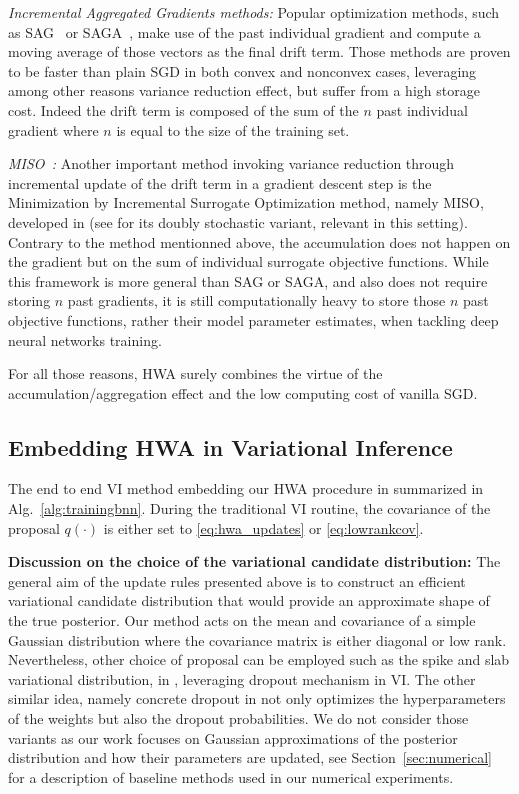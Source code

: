 \documentclass[tablecaption=bottom,wcp]{jmlr}
\begin{document}
\textit{Incremental Aggregated Gradients methods:} Popular optimization methods, such as SAG~\citep{schmidt2017minimizing} or SAGA~\citep{defazio2014saga}, make use of the past individual gradient and compute a moving average of those vectors as the final drift term. Those methods are proven to be faster than plain SGD in both convex and nonconvex cases, leveraging among other reasons variance reduction effect, but suffer from a high storage cost. Indeed the drift term is composed of the sum of the $n$ past individual gradient where $n$ is equal to the size of the training set.


\textit{MISO~\citep{mairal2015incremental}:} Another important method invoking variance reduction through incremental update of the drift term in a gradient descent step is the Minimization by Incremental Surrogate Optimization method, namely MISO, developed in \citet{mairal2015incremental} (see \citep{karimi2019doubly} for its doubly stochastic variant, relevant in this setting).
Contrary to the method mentionned above, the accumulation does not happen on the gradient but on the sum of individual surrogate objective functions.
While this framework is more general than SAG or SAGA, and also does not require storing $n$ past gradients, it is still computationally heavy to store those $n$ past objective functions, rather their model parameter estimates, when tackling deep neural networks training.

For all those reasons, \textsc{HWA} surely combines the virtue of the accumulation/aggregation effect and the low computing cost of vanilla SGD.



\subsection{Embedding HWA in Variational Inference}\label{app:viandhwa}
The end to end VI method embedding our HWA procedure in summarized in Alg.~\ref{alg:trainingbnn}.
During the traditional VI routine, the covariance of the proposal $q(\cdot)$ is either set to \eqref{eq:hwa_updates} or \eqref{eq:lowrankcov}.

\textbf{Discussion on the choice of the variational candidate distribution:} 
The general aim of the update rules presented above is to construct an efficient variational candidate distribution that would provide an approximate shape of the true posterior. Our method acts on the mean and covariance of a simple Gaussian distribution where the covariance matrix is either diagonal or low rank.
Nevertheless, other choice of proposal can be employed such as the spike and slab variational distribution, in \citep{gal2016dropout}, leveraging dropout mechanism in VI. 
The other similar idea, namely concrete dropout in \citep{gal2017concrete} not only optimizes the hyperparameters of the weights but also the dropout probabilities.
We do not consider those variants as our work focuses on Gaussian approximations of the posterior distribution and how their parameters are updated, see Section~\ref{sec:numerical} for a description of baseline methods used in our numerical experiments.
\end{document}

